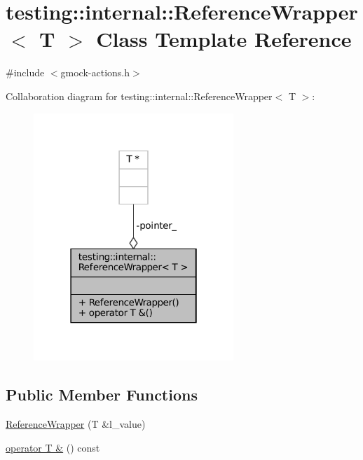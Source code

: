 \hypertarget{classtesting_1_1internal_1_1ReferenceWrapper}{}\section{testing\+:\+:internal\+:\+:Reference\+Wrapper$<$ T $>$ Class Template Reference}
\label{classtesting_1_1internal_1_1ReferenceWrapper}


{\ttfamily \#include $<$gmock-\/actions.\+h$>$}



Collaboration diagram for testing\+:\+:internal\+:\+:Reference\+Wrapper$<$ T $>$\+:
\nopagebreak
\begin{figure}[H]
\begin{center}
\leavevmode
\includegraphics[width=214pt]{classtesting_1_1internal_1_1ReferenceWrapper__coll__graph}
\end{center}
\end{figure}
\subsection*{Public Member Functions}
\begin{DoxyCompactItemize}
\item 
\hyperlink{classtesting_1_1internal_1_1ReferenceWrapper_ad33597ffc478c3af9190d1a288a76d39}{Reference\+Wrapper} (T \&l\+\_\+value)
\item 
\hyperlink{classtesting_1_1internal_1_1ReferenceWrapper_a187d6e6ffb4031444fff10dee7dc7de8}{operator T \&} () const
\end{DoxyCompactItemize}
